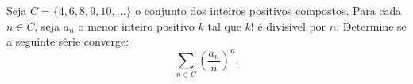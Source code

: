 Seja \(C=\{4,6,8,9,10,\ldots\}\) o conjunto dos inteiros positivos compostos. Para cada \(n\in C\), seja \(a_n\) o menor inteiro positivo \(k\) tal que \(k!\) é divisível por \(n\). Determine se a seguinte série converge:
\[\sum_{n\in C}\left(\frac{a_n}{n}\right)^n.\]
